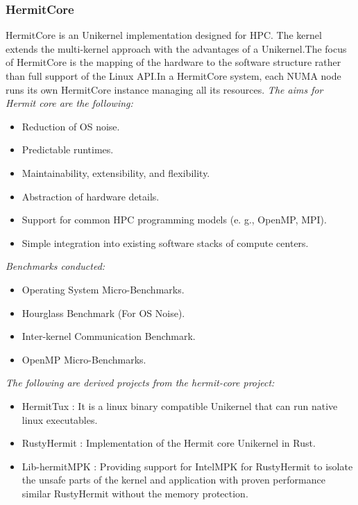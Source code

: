 \subsubsection{HermitCore}
HermitCore\cite{HermitCore} is an Unikernel implementation designed for HPC. The kernel extends the
multi-kernel approach with the advantages of a Unikernel.The focus of HermitCore is 
the mapping of the hardware to
the software structure rather than full support of the Linux
API.In a HermitCore system, each NUMA node runs its own HermitCore instance managing all its resources.
\emph{The aims for Hermit core are the following:}
\begin{itemize}
  \item Reduction of OS noise.
  \item Predictable runtimes.
  \item Maintainability, extensibility, and flexibility.
  \item Abstraction of hardware details.
  \item Support for common HPC programming models (e. g.,
  OpenMP, MPI).
  \item Simple integration into existing software stacks of
  compute centers.
\end{itemize}
\emph{Benchmarks conducted:}
\begin{itemize}
  \item Operating System Micro-Benchmarks.
  \item Hourglass Benchmark (For OS Noise).
  \item Inter-kernel Communication Benchmark.
  \item OpenMP Micro-Benchmarks.
\end{itemize}
\emph{The following are derived projects from the hermit-core project:}
\begin{itemize}
  \item HermitTux \cite{Hermitux} : It is a linux binary compatible Unikernel that can run native linux executables. 
  \item RustyHermit \cite{RustyHermit}: Implementation of the Hermit core Unikernel in Rust. 
  \item Lib-hermitMPK \cite{HermitMPK} : Providing support for IntelMPK for RustyHermit to isolate the unsafe parts of the kernel and 
  application with proven performance similar RustyHermit without the memory protection.
\end{itemize}

